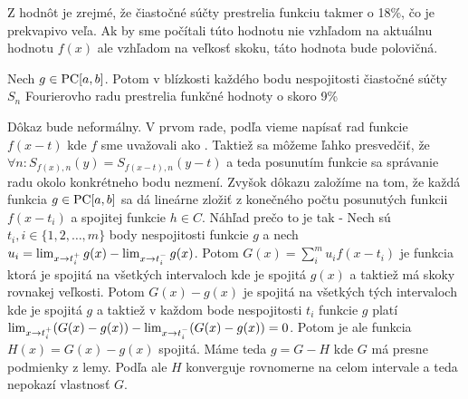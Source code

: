 Z hodnôt je zrejmé, že čiastočné súčty prestrelia funkciu takmer o
18\%, čo je prekvapivo veľa. Ak by sme počítali túto hodnotu nie
vzhľadom na aktuálnu hodnotu $f(x)$ ale vzhľadom na veľkosť skoku,
táto hodnota bude polovičná. 

\begin{lema}
    Nech $g\in \mbox{PC}[a,b]$. Potom v blízkosti každého bodu nespojitosti
    čiastočné súčty $S_n$ Fourierovho radu prestrelia funkčné hodnoty
    o skoro 9\%
\end{lema}
\begin{dokaz}
    Dôkaz bude neformálny. V prvom rade, podľa
     vieme napísať rad funkcie
    $f(x-t)$ kde $f$ sme uvažovali ako .
    Taktiež sa môžeme ľahko presvedčiť, že
    $\forall n: S_{f(x),n}(y) = S_{f(x-t),n}(y-t)$ a teda posunutím
    funkcie sa správanie radu okolo konkrétneho bodu nezmení.
    Zvyšok dôkazu založíme na tom, že každá funkcia $g\in\mbox{PC}[a,b]$
    sa dá lineárne zložiť z konečného počtu posunutých funkcii $f(x-t_i)$
    a spojitej funkcie $h\in C$. Náhľad prečo to je tak - 
    Nech sú $t_i, i\in\{1,2,\dots,m\}$ body nespojitosti funkcie $g$
    a nech $u_i = \lim_{x\rightarrow t_i^+} g(x) - \lim_{x\rightarrow t_i^-} g(x)$.
    Potom $G(x) = \sum_i^m u_i f(x-t_i)$ je funkcia ktorá je spojitá
    na všetkých intervaloch kde je spojitá $g(x)$ a taktiež má skoky
    rovnakej veľkosti. Potom $G(x)-g(x)$ je spojitá na všetkých tých
    intervaloch kde je spojitá $g$ a taktiež v každom bode
    nespojitosti $t_i$ funkcie $g$ platí 
    $\lim_{x\rightarrow t_i^+} (G(x)-g(x)) - \lim_{x\rightarrow t_i^-}
    (G(x)-g(x)) = 0$. Potom je ale funkcia $H(x)=G(x)-g(x)$ spojitá.
    Máme teda $g=G-H$ kde $G$ má presne podmienky z lemy. Podľa
     ale $H$ konverguje rovnomerne na celom
    intervale a teda nepokazí vlastnosť $G$.
\end{dokaz}

    
